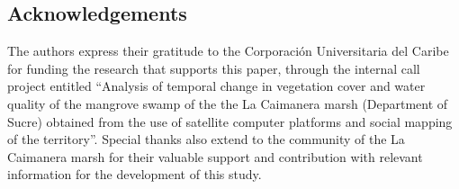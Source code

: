 \documentclass[10pt,a4paper,twocolumn]{article}
\begin{document}
\subsection*{Acknowledgements}
The authors express their gratitude to the Corporación Universitaria del Caribe for funding the research that supports this paper, through the internal call project entitled “Analysis of temporal change in vegetation cover and water quality of the mangrove swamp of the the La Caimanera marsh (Department of Sucre) obtained from the use of satellite computer platforms and social mapping of the territory”. Special thanks also extend to the community of the La Caimanera marsh for their valuable support and contribution with relevant information for the development of this study.

{\small
}

\bigskip








\end{document}
